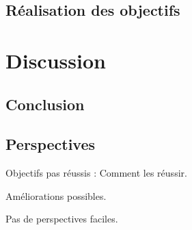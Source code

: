 \documentclass[a4paper,12pt,notitlepage]{report}
\begin{document}
\section{Réalisation des objectifs}

\chapter{Discussion}
\section{Conclusion}
\section{Perspectives}
Objectifs pas réussis : Comment les réussir.

Améliorations possibles.

Pas de perspectives faciles.


\nocite{*} %
\printbibliography
\end{document}
